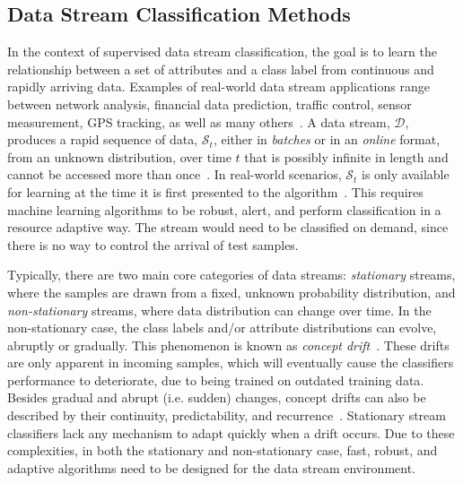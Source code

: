 \documentclass[reqno]{vcuthesis}
\newcommand{\proc}{{\mathcal D}}
\numberwithin{equation}{chapter}
\begin{document}
\subsection{Data Stream Classification Methods}
In the context of supervised data stream classification, the goal is to learn the relationship between a set of attributes and a class label from continuous and rapidly arriving data. Examples of real-world data stream applications range between network analysis, financial data prediction, traffic control, sensor measurement, GPS tracking, as well as many others~\cite{moacite,gaber2007survey,krawczyk2017ensemble}. A data stream, $\proc$, produces a rapid sequence of data, $\mathcal{S}_t$, either in \textit{batches} or in an \textit{online} format, from an unknown distribution, over time $t$ that is possibly infinite in length and cannot be accessed more than once~\cite{zang2014comparative}. In real-world scenarios, $\mathcal{S}_t$ is only available for learning at the time it is first presented to the algorithm~\cite{bifet2009new}. This requires machine learning algorithms to be robust, alert, and perform classification in a resource adaptive way. The stream would need to be classified on demand, since there is no way to control the arrival of test samples. 

Typically, there are two main core categories of data streams: \textit{stationary} streams, where the samples are drawn from a fixed, unknown probability distribution, and \textit{non-stationary} streams, where data distribution can change over time. In the non-stationary case, the class labels and/or attribute distributions can evolve, abruptly or gradually. This phenomenon is known as \textit{concept drift}~\cite{gama2014survey}. These drifts are only apparent in incoming samples, which will eventually cause the classifiers performance to deteriorate, due to being trained on outdated training data. Besides gradual and abrupt (i.e. sudden) changes, concept drifts can also be described by their continuity, predictability, and recurrence~\cite{krawczyk2017ensemble,webb2016characterizing}. Stationary stream classifiers lack any mechanism to adapt quickly when a drift occurs. Due to these complexities, in both the stationary and non-stationary case, fast, robust, and adaptive algorithms need to be designed for the data stream environment. 
\end{document}
